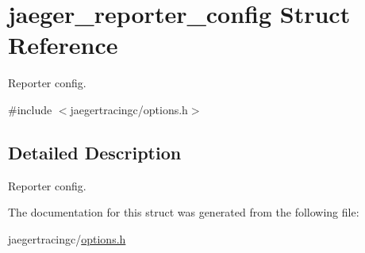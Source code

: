 \hypertarget{structjaeger__reporter__config}{}\section{jaeger\+\_\+reporter\+\_\+config Struct Reference}
\label{structjaeger__reporter__config}


Reporter config.  




{\ttfamily \#include $<$jaegertracingc/options.\+h$>$}



\subsection{Detailed Description}
Reporter config. 



The documentation for this struct was generated from the following file\+:\begin{DoxyCompactItemize}
\item 
jaegertracingc/\mbox{\hyperlink{options_8h}{options.\+h}}\end{DoxyCompactItemize}
